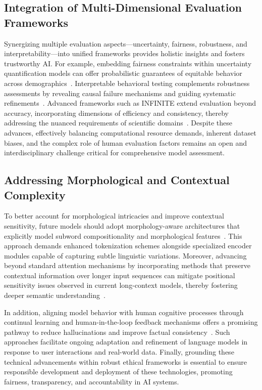 \documentclass[sigconf]{acmart}
\begin{document}
\subsection{Integration of Multi-Dimensional Evaluation Frameworks}

Synergizing multiple evaluation aspects—uncertainty, fairness, robustness, and interpretability—into unified frameworks provides holistic insights and fosters trustworthy AI. For example, embedding fairness constraints within uncertainty quantification models can offer probabilistic guarantees of equitable behavior across demographics~\cite{ref35,ref41}. Interpretable behavioral testing complements robustness assessments by revealing causal failure mechanisms and guiding systematic refinements~\cite{ref36,ref40}. Advanced frameworks such as INFINITE extend evaluation beyond accuracy, incorporating dimensions of efficiency and consistency, thereby addressing the nuanced requirements of scientific domains~\cite{ref15}. Despite these advances, effectively balancing computational resource demands, inherent dataset biases, and the complex role of human evaluation factors remains an open and interdisciplinary challenge critical for comprehensive model assessment.

\subsection{Addressing Morphological and Contextual Complexity}

To better account for morphological intricacies and improve contextual sensitivity, future models should adopt morphology-aware architectures that explicitly model subword compositionality and morphological features~\cite{ref38}. This approach demands enhanced tokenization schemes alongside specialized encoder modules capable of capturing subtle linguistic variations. Moreover, advancing beyond standard attention mechanisms by incorporating methods that preserve contextual information over longer input sequences can mitigate positional sensitivity issues observed in current long-context models, thereby fostering deeper semantic understanding~\cite{ref26}. 

In addition, aligning model behavior with human cognitive processes through continual learning and human-in-the-loop feedback mechanisms offers a promising pathway to reduce hallucinations and improve factual consistency~\cite{ref20,ref30}. Such approaches facilitate ongoing adaptation and refinement of language models in response to user interactions and real-world data. Finally, grounding these technical advancements within robust ethical frameworks is essential to ensure responsible development and deployment of these technologies, promoting fairness, transparency, and accountability in AI systems.
\end{document}
